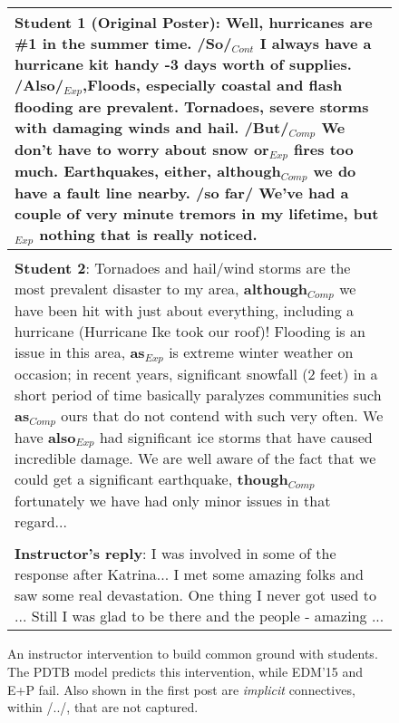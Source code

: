 \documentclass[letterpaper]{article}
\begin{document}
\begin{figure}[t]
\small 
\begin{tabular}{|p{7.8cm}|}
\hline 
\textbf{Student 1 (Original Poster)}: Well, hurricanes are \#1 in the summer time. 
/\textbf{So}/$_{Cont}$ I always have a hurricane kit handy 
-3 days worth of supplies. 
/\textbf{Also}/$_{Exp}$,Floods, especially coastal and flash flooding are 
prevalent. Tornadoes, severe storms with damaging winds and hail. 
/\textbf{But}/$_{Comp}$ We don't have to worry about 
snow \textbf{or}$_{Exp}$ fires too much. Earthquakes, either, 
\textbf{although}$_{Comp}$ we do have a fault line 
nearby. /\textbf{so far}/ We've had a couple of very minute tremors 
in my lifetime, \textbf{but}$_{Exp}$ nothing that is really noticed.  \\

\hline \\

\textbf{Student 2}: Tornadoes and hail/wind storms are the most prevalent 
disaster to my area, \textbf{although}$_{Comp}$ we have been hit with just 
about everything, including a hurricane (Hurricane Ike took our roof)! 
Flooding is an issue in this area, \textbf{as}$_{Exp}$ is extreme winter 
weather on occasion; in recent years, significant snowfall (2 feet) in a short 
period of time basically paralyzes communities such \textbf{as}$_{Comp}$ ours 
that do not contend with such very often. We have \textbf{also}$_{Exp}$ had 
significant ice storms that have caused incredible damage. We are well aware 
of the fact that we could get a significant earthquake, 
\textbf{though}$_{Comp}$ fortunately we have 
had only minor issues in that regard...  \\

\hline \\

\textbf{Instructor's reply}: I was involved in some of the response
after Katrina...  I met some amazing folks and saw some real
devastation. One thing I never got used to ... Still I was glad to be
there and the people - amazing ...  \\

\hline
\end{tabular}
\caption{An instructor intervention to build common ground with students. The 
PDTB model predicts this intervention, while EDM'15 and E+P fail. Also shown 
in the first post are \textit{implicit} connectives, within /../, that are not
captured.%
}
\label{fig:example-pdtb}
\end{figure}
\end{document}
